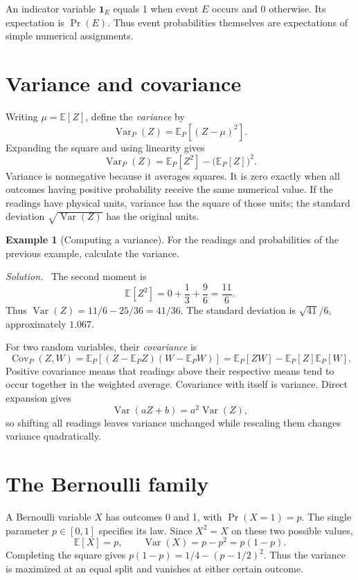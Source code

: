 \documentclass[11pt,oneside,openany]{book}
\theoremstyle{definition}
\newtheorem{example}{Example}[chapter]
\theoremstyle{remark}
\newenvironment{solution}{\par\smallskip\noindent\textit{Solution.}\ }{\par\smallskip}
\newcommand{\E}{\mathbb{E}}
\newcommand{\Var}{\operatorname{Var}}
\newcommand{\Cov}{\operatorname{Cov}}
\numberwithin{equation}{chapter}
\begin{document}
An indicator variable $\mathbf{1}_E$ equals 1 when event $E$ occurs and 0 otherwise. Its expectation is $\Pr(E)$. Thus event probabilities themselves are expectations of simple numerical assignments.

\section{Variance and covariance}
Writing $\mu=\E[Z]$, define the \emph{variance} by
\[
\Var_P(Z)=\E_P[(Z-\mu)^2].
\]
Expanding the square and using linearity gives
\begin{equation}\label{eq:variance}
\Var_P(Z)=\E_P[Z^2]-\bigl(\E_P[Z]\bigr)^2.
\end{equation}
Variance is nonnegative because it averages squares. It is zero exactly when all outcomes having positive probability receive the same numerical value. If the readings have physical units, variance has the square of those units; the standard deviation $\sqrt{\Var(Z)}$ has the original units.

\begin{example}[Computing a variance]
For the readings and probabilities of the previous example, calculate the variance.
\begin{solution}
The second moment is
\[
\E[Z^2]=0+\frac13+\frac{9}{6}=\frac{11}{6}.
\]
Thus $\Var(Z)=11/6-25/36=41/36$. The standard deviation is $\sqrt{41}/6$, approximately $1.067$.
\end{solution}
\end{example}

For two random variables, their \emph{covariance} is
\begin{equation}\label{eq:covariance}
\Cov_P(Z,W)=\E_P[(Z-\E_PZ)(W-\E_PW)]
=\E_P[ZW]-\E_P[Z]\E_P[W].
\end{equation}
Positive covariance means that readings above their respective means tend to occur together in the weighted average. Covariance with itself is variance. Direct expansion gives
\[
\Var(aZ+b)=a^2\Var(Z),
\]
so shifting all readings leaves variance unchanged while rescaling them changes variance quadratically.

\section{The Bernoulli family}
A Bernoulli variable $X$ has outcomes 0 and 1, with $\Pr(X=1)=p$. The single parameter $p\in[0,1]$ specifies its law. Since $X^2=X$ on these two possible values,
\begin{equation}\label{eq:bernoullimoments}
\E[X]=p,\qquad \Var(X)=p-p^2=p(1-p).
\end{equation}
Completing the square gives $p(1-p)=1/4-(p-1/2)^2$. Thus the variance is maximized at an equal split and vanishes at either certain outcome.
\end{document}
